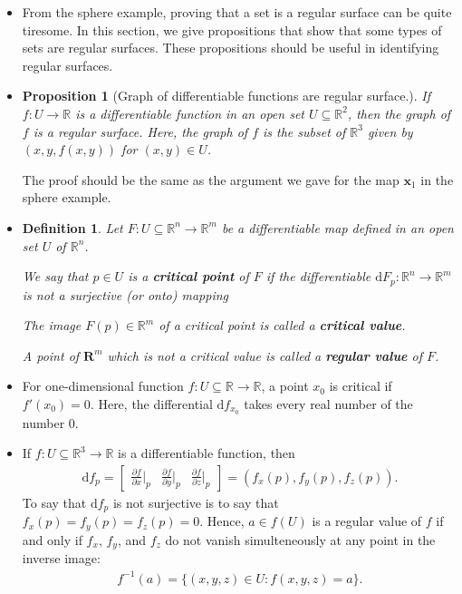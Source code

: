 \documentclass[10pt]{article}
\newtheorem{definition}[lemma]{Definition}
\newtheorem{proposition}[lemma]{Proposition}
\newcommand{\dee}{\mathrm{d}}
\newcommand{\ve}[1]{\mathbf{#1}}
\newcommand{\ra}{\rightarrow}
\newcommand{\Real}{\mathbb{R}}
\newcommand{\sseq}{\subseteq}
\begin{document}
  \begin{itemize}
    \item From the sphere example, proving that a set is a regular surface can be quite tiresome. In this section, we give propositions that show that some types of sets are regular surfaces. These propositions should be useful in identifying regular surfaces.

    \item \begin{proposition}[Graph of differentiable functions are regular surface.] \label{graph-is-regular-surface}
      If $f:U \ra \Real$ is a differentiable function in an open set $U \sseq \Real^2$, then the graph of $f$ is a regular surface. Here, the graph of $f$ is the subset of $\Real^3$ given by $(x,y,f(x,y))$ for $(x,y) \in U$.
    \end{proposition}
    The proof should be the same as the argument we gave for the map $\ve{x}_1$ in the sphere example.

    \item \begin{definition}
      Let $F: U \sseq \Real^n \ra \Real^m$ be a differentiable map defined in an open set $U$ of $\Real^n$.

      We say that $p \in U$ is a {\bf critical point} of $F$ if the differentiable $\dee F_p : \Real^n \ra \Real^m$ is not a surjective (or onto) mapping 

      The image $F(p) \in \Real^m$ of a critical point is called a {\bf critical value}. 

      A point of $\ve{R}^m$ which is not a critical value is called a {\bf regular value} of $F$.
    \end{definition}

    \item For one-dimensional function $f: U \sseq \Real \ra \Real$, a point $x_0$ is critical if $f'(x_0) = 0$. Here, the differential $\dee f_{x_0}$ takes every real number of the number $0$.

    \item If $f : U \sseq \Real^3 \ra \Real$ is a differentiable function, then
    \begin{align*}
      \dee f_p = \begin{bmatrix}
        \frac{\partial f}{\partial x}\big|_p & \frac{\partial f}{\partial y}\big|_p & \frac{\partial f}{\partial z}\big|_p 
      \end{bmatrix}
      = (f_x(p), f_y(p), f_z(p)).
    \end{align*}
    To say that $\dee f_p$ is not surjective is to say that $f_x(p) = f_y(p) = f_z(p) = 0$. Hence, $a \in f(U)$ is a regular value of $f$ if and only if $f_x$, $f_y$, and $f_z$ do not vanish simulteneously at any point in the inverse image:
    \begin{align*}
      f^{-1}(a) = \{ (x,y,z) \in U : f(x,y,z) = a\}.
    \end{align*}


\end{itemize}
\end{document}
